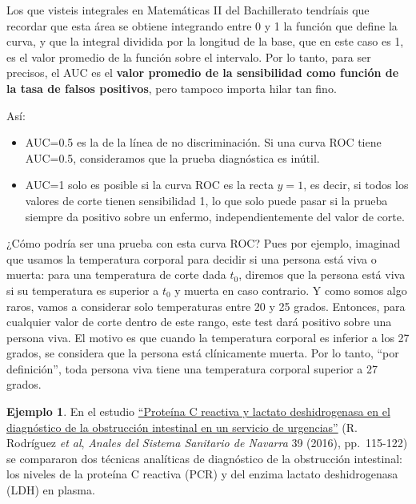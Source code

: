 \documentclass[
]{book}
\theoremstyle{definition}
\theoremstyle{definition}
\newtheorem{example}{Ejemplo}[chapter]
\theoremstyle{definition}
\theoremstyle{definition}
\theoremstyle{remark}
\begin{document}
\begin{rmdcorbes}
Los que visteis integrales en Matemáticas II del Bachillerato tendríais que recordar que esta área se obtiene integrando entre 0 y 1 la función que define la curva, y que la integral dividida por la longitud de la base, que en este caso es 1, es el valor promedio de la función sobre el intervalo. Por lo tanto, para ser precisos, el AUC es el \textbf{valor promedio de la sensibilidad como función de la tasa de falsos positivos}, pero tampoco importa hilar tan fino.
\end{rmdcorbes}

Así:

\begin{itemize}
\item
  AUC=0.5 es la de la línea de no discriminación. Si una curva ROC tiene AUC=0.5, consideramos que la prueba diagnóstica es inútil.
\item
  AUC=1 solo es posible si la curva ROC es la recta \(y=1\), es decir, si todos los valores de corte tienen sensibilidad 1, lo que solo puede pasar si la prueba siempre da positivo sobre un enfermo, independientemente del valor de corte.
\end{itemize}

\begin{rmdromans}
¿Cómo podría ser una prueba con esta curva ROC? Pues por ejemplo, imaginad que usamos la temperatura corporal para decidir si una persona está viva o muerta: para una temperatura de corte dada \(t_0\), diremos que la persona está viva si su temperatura es superior a \(t_0\) y muerta en caso contrario. Y como somos algo raros, vamos a considerar solo temperaturas entre 20 y 25 grados. Entonces, para cualquier valor de corte dentro de este rango, este test dará positivo sobre una persona viva. El motivo es que cuando la temperatura corporal es inferior a los 27 grados, se considera que la persona está clínicamente muerta. Por lo tanto, ``por definición'', toda persona viva tiene una temperatura corporal superior a 27 grados.
\end{rmdromans}

\begin{example}
\protect\hypertarget{exm:unnamed-chunk-174}{}\label{exm:unnamed-chunk-174}En el estudio \href{http://scielo.isciii.es/pdf/asisna/v39n1/13_original_breve4.pdf}{``Proteína C reactiva y lactato deshidrogenasa en el diagnóstico de la obstrucción intestinal en un servicio de urgencias''}
(R. Rodríguez \emph{et al}, \emph{Anales del Sistema Sanitario de Navarra} 39 (2016), pp.~115-122) se compararon dos técnicas analíticas de diagnóstico de la obstrucción intestinal: los niveles de la proteína C reactiva (PCR) y del enzima lactato deshidrogenasa (LDH) en plasma.
\end{example}
\end{document}
